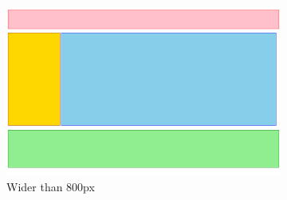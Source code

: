 \begin{figure}[htb]\vspace{10pt}\centering
    \begin{subfigure}{.63\textwidth}\centering
        \includegraphics[width=\textwidth]{images/css-designing-html/exercise-responsive-2-wide.png}
        \caption{Wider than 800px}
        \label{fig:exercise-responsive-2-wide}
    \end{subfigure}
    \begin{subfigure}{.21\textwidth}\centering

\end{subfigure}
\end{figure}
